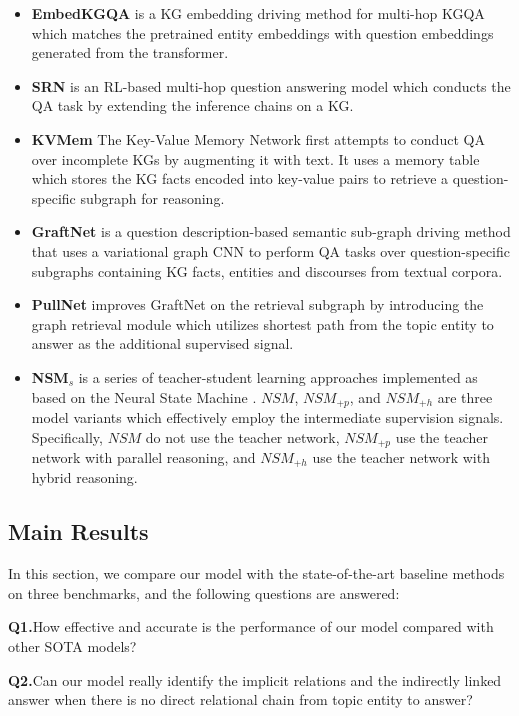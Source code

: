 \documentclass[pdflatex,sn-mathphys]{sn-jnl}%
\theoremstyle{thmstyleone}%
\theoremstyle{thmstyletwo}%
\theoremstyle{thmstylethree}%
\begin{document}
\begin{itemize}
\item \textbf{EmbedKGQA} \cite{apoorv2020embedKGQA} is a KG embedding driving method for multi-hop KGQA which matches the pretrained entity embeddings with question embeddings generated from the transformer.
\item \textbf{SRN} \cite{srn} is an RL-based multi-hop question answering model which conducts the QA task by extending the inference chains on a KG.
\item \textbf{KVMem} \cite{kvmem} The Key-Value Memory Network first attempts to conduct QA over incomplete KGs by augmenting it with text. It uses a memory table which stores the KG facts encoded into key-value pairs to retrieve a question-specific subgraph for reasoning. 
\item \textbf{GraftNet} \cite{sun2018graftnet} is a question description-based semantic sub-graph driving method that uses a variational graph CNN to perform QA tasks over question-specific subgraphs containing KG facts, entities and discourses from textual corpora.
\item \textbf{PullNet} \cite{pullnet} improves GraftNet on the retrieval subgraph by introducing the graph retrieval module which utilizes shortest path from the topic entity to answer as the additional supervised signal.

\item \textbf{NSM}$_{s}$ \cite{he2021stu-teaQA} is a series of teacher-student learning approaches implemented as based on the Neural State Machine \cite{nsm}. $NSM$, $NSM_{+p}$, and $NSM_{+h}$ are three model variants which effectively employ the intermediate supervision signals. Specifically, $NSM$ do not use the teacher network, $NSM_{+p}$ use the teacher network with parallel reasoning, and $NSM_{+h}$ use the teacher network with hybrid reasoning.
\end{itemize}

\subsection{Main Results}
In this section, we compare our model with the state-of-the-art baseline methods on three benchmarks, and the following questions are answered:

\textbf{Q1.}\quad How effective and accurate is the performance of our model compared with other SOTA models?

\textbf{Q2.}\quad Can our model really identify the implicit relations and the indirectly linked answer when there is no direct relational chain from topic entity to answer?
\end{document}
